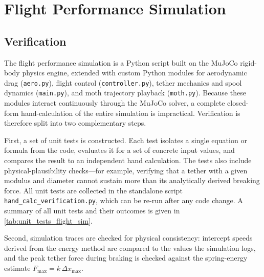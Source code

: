 
\section*{Flight Performance Simulation}
\label{sec:flight_sim_vv}

\subsection*{Verification}

The flight performance simulation is a Python script built on the MuJoCo rigid-body physics engine, extended with custom Python modules for aerodynamic drag (\texttt{aero.py}), flight control (\texttt{controller.py}), tether mechanics and spool dynamics (\texttt{main.py}), and moth trajectory playback (\texttt{moth.py}). Because these modules interact continuously through the MuJoCo solver, a complete closed-form hand-calculation of the entire simulation is impractical. Verification is therefore split into two complementary steps.

First, a set of unit tests is constructed. Each test isolates a single equation or formula from the code, evaluates it for a set of concrete input values, and compares the result to an independent hand calculation. The tests also include physical-plausibility checks—for example, verifying that a tether with a given modulus and diameter cannot sustain more than its analytically derived breaking force. All unit tests are collected in the standalone script \texttt{hand\_calc\_verification.py}, which can be re-run after any code change. A summary of all unit tests and their outcomes is given in \autoref{tab:unit_tests_flight_sim}.

Second, simulation traces are checked for physical consistency: intercept speeds derived from the energy method are compared to the values the simulation logs, and the peak tether force during braking is checked against the spring-energy estimate $F_\text{max} = k \, \Delta x_\text{max}$.

\begingroup
\footnotesize
\renewcommand{\arraystretch}{1.3}
\setlength{\tabcolsep}{6pt}
\setlength{\extrarowheight}{2pt}

